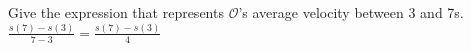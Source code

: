 {Give the expression that represents $\mathcal{O}$'s average velocity between 3 and 7s.}
{$\frac{s(7)-s(3)}{7-3}=\frac{s(7)-s(3)}{4}$}